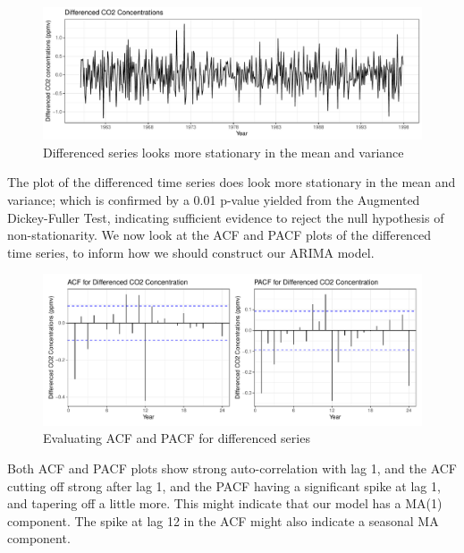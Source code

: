 \documentclass[
]{article}
\begin{document}
\begin{figure}

{\centering \includegraphics[width=1\linewidth]{lab_prompt_Updated_files/figure-latex/arima-differencing-1} 

}

\caption{Differenced series looks more stationary in the mean and variance}\label{fig:arima-differencing}
\end{figure}

The plot of the differenced time series does look more stationary in the mean and variance; which is confirmed by a 0.01 p-value yielded from the Augmented Dickey-Fuller Test, indicating sufficient evidence to reject the null hypothesis of non-stationarity. We now look at the ACF and PACF plots of the differenced time series, to inform how we should construct our ARIMA model.

\newpage

\begin{figure}

{\centering \includegraphics[width=1\linewidth]{lab_prompt_Updated_files/figure-latex/acf-pacf-1} 

}

\caption{Evaluating ACF and PACF for differenced series}\label{fig:acf-pacf}
\end{figure}

Both ACF and PACF plots show strong auto-correlation with lag 1, and the ACF cutting off strong after lag 1, and the PACF having a significant spike at lag 1, and tapering off a little more. This might indicate that our model has a MA(1) component. The spike at lag 12 in the ACF might also indicate a seasonal MA component.
\end{document}
